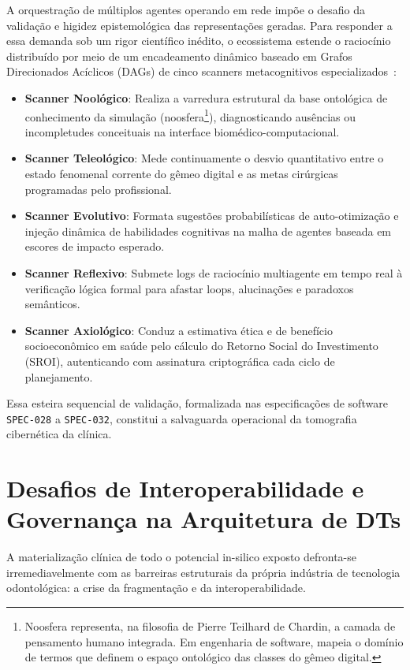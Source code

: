 A orquestração de múltiplos agentes operando em rede impõe o desafio da validação e higidez epistemológica das representações geradas. Para responder a essa demanda sob um rigor científico inédito, o ecossistema estende o raciocínio distribuído por meio de um encadeamento dinâmico baseado em Grafos Direcionados Acíclicos (DAGs) de cinco scanners metacognitivos especializados~\cite{katsoulakis2024digital, roy2025applications}:
\begin{itemize}
    \item \textbf{Scanner Noológico}: Realiza a varredura estrutural da base ontológica de conhecimento da simulação (noosfera\footnote{Noosfera representa, na filosofia de Pierre Teilhard de Chardin, a camada de pensamento humano integrada. Em engenharia de software, mapeia o domínio de termos que definem o espaço ontológico das classes do gêmeo digital.}), diagnosticando ausências ou incompletudes conceituais na interface biomédico-computacional.
    \item \textbf{Scanner Teleológico}: Mede continuamente o desvio quantitativo entre o estado fenomenal corrente do gêmeo digital e as metas cirúrgicas programadas pelo profissional.
    \item \textbf{Scanner Evolutivo}: Formata sugestões probabilísticas de auto-otimização e injeção dinâmica de habilidades cognitivas na malha de agentes baseada em escores de impacto esperado.
    \item \textbf{Scanner Reflexivo}: Submete logs de raciocínio multiagente em tempo real à verificação lógica formal para afastar loops, alucinações e paradoxos semânticos.
    \item \textbf{Scanner Axiológico}: Conduz a estimativa ética e de benefício socioeconômico em saúde pelo cálculo do Retorno Social do Investimento (SROI), autenticando com assinatura criptográfica cada ciclo de planejamento.
\end{itemize}
Essa esteira sequencial de validação, formalizada nas especificações de software \texttt{SPEC-028} a \texttt{SPEC-032}, constitui a salvaguarda operacional da tomografia cibernética da clínica.

\section{Desafios de Interoperabilidade e Governança na Arquitetura de DTs}

A materialização clínica de todo o potencial in-silico exposto defronta-se irremediavelmente com as barreiras estruturais da própria indústria de tecnologia odontológica: a crise da fragmentação e da interoperabilidade.

